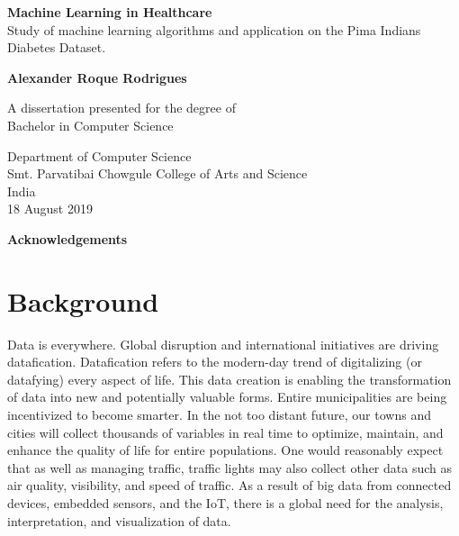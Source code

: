 \documentclass[12pt]{article}
\begin{document}
\begin{titlepage}
    \begin{center}
        \vspace*{1cm} 
        \Huge
        \textbf{Machine Learning in Healthcare} 
        \vspace{0.5cm}
        \normalsize
        \vspace{0cm}
        \\
        Study of machine learning algorithms and application on the Pima Indians Diabetes Dataset.
 
        \vspace{1.5cm}
 
        \textbf{Alexander Roque Rodrigues}
 
        \vfill
 
        A dissertation presented for the degree of\\
        Bachelor in Computer Science
 
        \vspace{0.8cm}
  
        \Large
        Department of Computer Science\\        
        Smt. Parvatibai Chowgule College of Arts and Science\\
        India\\
        18 August 2019
 
    \end{center}
\end{titlepage}
\Huge
\newpage
\huge
\textbf{Acknowledgements}
\normalsize
\newpage
\tableofcontents
\newpage
\part{Background}
Data is everywhere. Global disruption and international initiatives are
driving datafication. Datafication refers to the modern-day trend of
digitalizing (or datafying) every aspect of life. This data creation is enabling
the transformation of data into new and potentially valuable forms. Entire
municipalities are being incentivized to become smarter. In the not too
distant future, our towns and cities will collect thousands of variables in
real time to optimize, maintain, and enhance the quality of life for entire
populations. One would reasonably expect that as well as managing traffic,
traffic lights may also collect other data such as air quality, visibility, and
speed of traffic. As a result of big data from connected devices, embedded
sensors, and the IoT, there is a global need for the analysis, interpretation,
and visualization of data.
\end{document}
